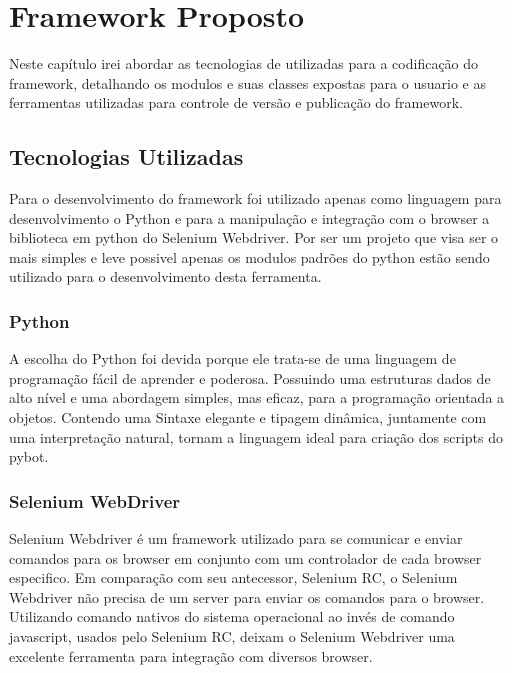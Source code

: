 %
%

\chapter{Framework Proposto}

    Neste capítulo irei abordar as tecnologias de utilizadas para a codificação do framework,
    detalhando os modulos e suas classes expostas para o usuario e as ferramentas utilizadas
    para controle de versão e publicação do framework.


    \section{Tecnologias Utilizadas}

        Para o desenvolvimento do framework foi utilizado apenas como linguagem para desenvolvimento o Python
        e para a manipulação e integração com o browser a biblioteca em python do Selenium Webdriver. Por ser um
        projeto que visa ser o mais simples e leve possivel apenas os modulos padrões do python estão sendo utilizado
        para o desenvolvimento desta ferramenta.


        \subsection{Python}

            A escolha do Python \cite{python} foi devida porque ele trata-se de uma linguagem de programação fácil de aprender e poderosa.
            Possuindo uma estruturas dados de alto nível e uma abordagem simples, mas eficaz, para a programação orientada
            a objetos. Contendo uma Sintaxe elegante e tipagem dinâmica, juntamente com uma interpretação natural, tornam
            a linguagem ideal para criação dos scripts do pybot.

        \subsection{Selenium WebDriver}
            Selenium Webdriver \cite{webdriver} é um framework utilizado para se comunicar e enviar comandos para os browser
            em conjunto com um controlador de cada browser especifico. Em comparação com seu antecessor, Selenium RC, o Selenium Webdriver
            não precisa de um server para enviar os comandos para o browser. Utilizando comando nativos do sistema operacional ao invés de
            comando javascript, usados pelo Selenium RC, deixam o Selenium Webdriver uma excelente ferramenta para integração com diversos
            browser.

